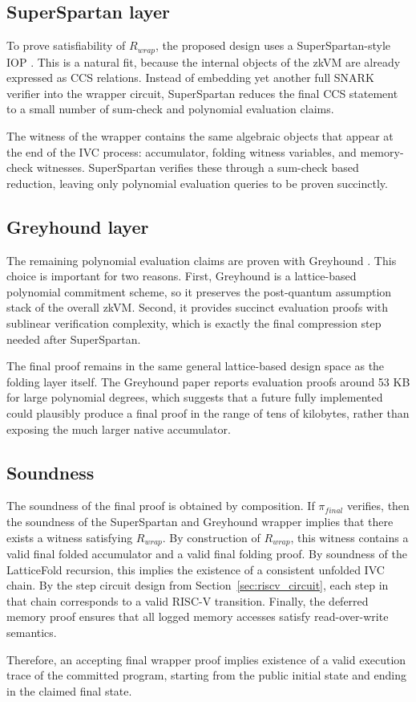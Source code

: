 \subsection{SuperSpartan layer}

To prove satisfiability of $R_{wrap}$, the proposed design uses a
SuperSpartan-style IOP \cite{Spartan, HyperNova, CCS}. This is a natural fit,
because the internal objects of the zkVM are already expressed as CCS relations.
Instead of embedding yet another full SNARK verifier into the wrapper circuit,
SuperSpartan reduces the final CCS statement to a small number of sum-check and
polynomial evaluation claims.

The witness of the wrapper contains the same algebraic objects that
appear at the end of the IVC process: accumulator, folding witness
variables, and memory-check witnesses. SuperSpartan verifies these through a
sum-check based reduction, leaving only polynomial evaluation queries to be
proven succinctly.

\subsection{Greyhound layer}

The remaining polynomial evaluation claims are proven with Greyhound
\cite{Greyhound}. This choice is important for two reasons. First, Greyhound is
a lattice-based polynomial commitment scheme, so it preserves the post-quantum
assumption stack of the overall zkVM. Second, it provides succinct evaluation
proofs with sublinear verification complexity, which is exactly the final
compression step needed after SuperSpartan.

The final proof remains in
the same general lattice-based design space as the folding layer itself. The
Greyhound paper reports evaluation proofs around 53 KB for large polynomial
degrees, which suggests that a future fully implemented could plausibly
produce a final proof in the range of tens of kilobytes, rather than exposing
the much larger native accumulator.

\subsection{Soundness}

The soundness of the final proof is obtained by composition. If
$\pi_{final}$ verifies, then the soundness of the SuperSpartan and Greyhound
wrapper implies that there exists a witness satisfying $R_{wrap}$. By
construction of $R_{wrap}$, this witness contains a valid final folded
accumulator and a valid final folding proof. By soundness of the LatticeFold
recursion, this implies the existence of a consistent unfolded IVC chain. By the
step circuit design from Section~\ref{sec:riscv_circuit}, each step in that
chain corresponds to a valid RISC-V transition. Finally, the deferred memory
proof ensures that all logged memory accesses satisfy read-over-write semantics.

Therefore, an accepting final wrapper proof implies existence of a valid
execution trace of the committed program, starting from the public initial state
and ending in the claimed final state.
